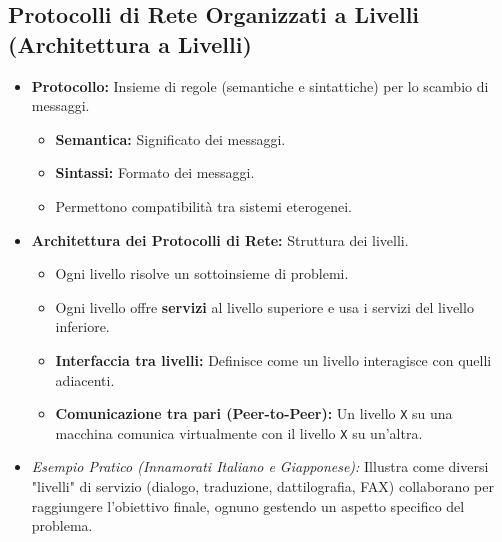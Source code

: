 \documentclass{article}
\begin{document}
\subsection{Protocolli di Rete Organizzati a Livelli (Architettura a Livelli)}
\begin{itemize}
    \item \textbf{Protocollo:} Insieme di regole (semantiche e sintattiche) per lo scambio di messaggi.
    \begin{itemize}
        \item \textbf{Semantica:} Significato dei messaggi.
        \item \textbf{Sintassi:} Formato dei messaggi.
        \item Permettono compatibilità tra sistemi eterogenei.
    \end{itemize}
    \item \textbf{Architettura dei Protocolli di Rete:} Struttura dei livelli.
    \begin{itemize}
        \item Ogni livello risolve un sottoinsieme di problemi.
        \item Ogni livello offre \textbf{servizi} al livello superiore e usa i servizi del livello inferiore.
        \item \textbf{Interfaccia tra livelli:} Definisce come un livello interagisce con quelli adiacenti.
        \item \textbf{Comunicazione tra pari (Peer-to-Peer):} Un livello \texttt{X} su una macchina comunica virtualmente con il livello \texttt{X} su un'altra.
    \end{itemize}
    \item \textit{Esempio Pratico (Innamorati Italiano e Giapponese):}
    Illustra come diversi "livelli" di servizio (dialogo, traduzione, dattilografia, FAX) collaborano per raggiungere l'obiettivo finale, ognuno gestendo un aspetto specifico del problema.
\end{itemize}
\end{document}
